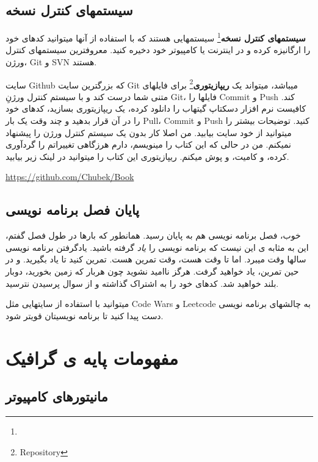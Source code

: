 \documentclass[14pt,a4paper]{memoir}
\begin{document}
	
	
	\section{سیستمهای کنترل نسخه}\label{revcontrol}
	 
	 \textbf{سیستمهای کنترل نسخه}\footnote{} سیستمهایی هستند که با استفاده از آنها میتوانید کدهای خود را ارگانیزه کرده و در اینترنت یا کامپیوتر خود دخیره کنید. معروفترین سیستمهای کنترل ورژن، Git و SVN هستند.
	 
	 سایت Github که بزرگترین سایت Git میباشد، میتواند یک \textbf{ریپازیتوری}\footnote{Repository} برای فایلهای متنی شما درست کند و با سیستم کنترل ورژنِ Git، فایلها را Commit و Push کند. کافیست نرم افزار دسکتاپ گیتهاب را دانلود کرده، یک ریپازیتوری بسازید، کدهای خود را در آن قرار بدهید و چند وقت یک بار Pull، Commit و Push کنید. توضیحات بیشتر را میتوانید از خود سایت بیابید. من اصلا کار بدون یک سیستم کنترل ورژن را پیشنهاد نمیکنم. من در حالی که این کتاب را مینویسم، دارم هرزگاهی تغییراتم را گردآوری کرده، و کامیت، و پوش میکنم. ریپازیتوری این کتاب را میتوانید در لینک زیر بیابید.
	 
	 \url{https://github.com/Chubek/Book}
	 
	 \section{پایان فصل برنامه نویسی}
	 خوب، فصل برنامه نویسی هم به پایان رسید. همانطور که بارها در طول فصل گفتم، این به مثابه ی این نیست که برنامه نویسی را \textit{یاد} گرفته باشید. یادگرفتن برنامه نویسی سالها وقت میبرد. اما تا وقت هست، وقت تمرین هست. تمرین کنید تا یاد بگیرید. و در حین تمرین، یاد خواهید گرفت. هرگز ناامید نشوید چون هربار که زمین بخورید، دوبار بلند خواهید شد. کدهای خود را به اشتراک گذاشته و از سوال پرسیدن نترسید. 
	 
	میتوانید با استفاده از سایتهایی مثل Code Wars و Leetcode به چالشهای برنامه نویسی دست پیدا کنید تا برنامه نویسیتان قویتر شود.
	 
	 
	 
	 \chapter{مفهومات پایه ی گرافیک}\label{graphicsbasis}
	 
	 
	 \section{مانیتورهای کامپیوتر}\label{displays}
\end{document}
